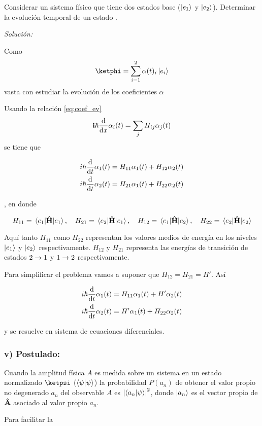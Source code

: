      \begin{example}
       Considerar un sistema físico que tiene dos estados base ($\ket{e_1}$ y $\ket{e_2}$). Determinar la evolución temporal de un estado \ketpsi.

       \textit{Solución:}

       Como
       $$
         \ketphi=\sum_{i=1}^2\alpha(t)_i\ket{e_i}
       $$
       vasta con estudiar la evolución de los coeficientes $\alpha$

       Usando la relación \autoref{eq:coef_ev}
       $$
         \vb{i}\hbar \dv{x} \alpha_i(t)=\sum_j H_{ij}\alpha_j(t)
       $$
       se tiene que

       \begin{align*}
          & i\hbar\dv{t}\alpha_1(t)=H_{11}\alpha_1(t)+H_{12}\alpha_2(t) \\
          & i\hbar\dv{t}\alpha_2(t)=H_{21}\alpha_1(t)+H_{22}\alpha_2(t)
       \end{align*}

       , en donde

       $$
         H_{11}=\mel{e_1}{\vu{H}}{e_1}\qc H_{21}=\mel{e_2}{\vu{H}}{e_1}\qc H_{12}=\mel{e_1}{\vu{H}}{e_2}\qc H_{22}=\mel{e_2}{\vu{H}}{e_2}
       $$

       Aquí tanto $H_{11}$ como $H_{22}$ representan los valores medios de energía en los niveles $\ket{e_1}$ y $\ket{e_2}$ respectivamente. $H_{12}$ y $H_{21}$ representa las energías de transición de estados $2\rightarrow 1$ y $1\rightarrow 2$ respectivamente.

       Para simplificar el problema vamos a suponer que $H_{12}=H_{21}=H'$. Así

       \begin{align*}
          & i\hbar\dv{t}\alpha_1(t)=H_{11}\alpha_1(t)+H'\alpha_2(t) \\
          & i\hbar\dv{t}\alpha_2(t)=H'\alpha_1(t)+H_{22}\alpha_2(t)
       \end{align*}

       y se resuelve en sistema de ecuaciones diferenciales.
     \end{example}

   \subsubsection{v) Postulado:} Cuando la amplitud física $A$ es medida sobre un sistema en un estado normalizado $\ketpsi$ ($\braket{\psi}$) la probabilidad $P(a_n)$ de obtener el valor propio no degenerado $a_n$ del observable $A$ es $\abs{\braket{a_n}{\psi}}^2$, donde $\ket{a_n}$ es el vector propio de $\vu{A}$ asociado al valor propio $a_n$.

     Para facilitar la